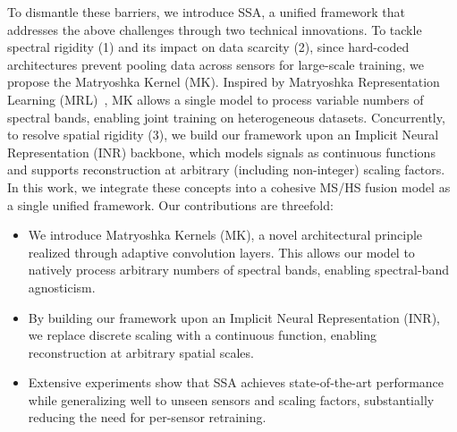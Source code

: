 To dismantle these barriers, we introduce SSA, a unified framework that addresses the above challenges through two technical innovations. To tackle spectral rigidity (1) and its impact on data scarcity (2), since hard-coded architectures prevent pooling data across sensors for large-scale training, we propose the Matryoshka Kernel (MK). Inspired by Matryoshka Representation Learning (MRL)~\cite{kusupati2022matryoshka}, MK allows a single model to process variable numbers of spectral bands, enabling joint training on heterogeneous datasets. Concurrently, to resolve spatial rigidity (3), we build our framework upon an Implicit Neural Representation (INR) backbone, which models signals as continuous functions and supports reconstruction at arbitrary (including non-integer) scaling factors.
In this work, we integrate these concepts into a cohesive MS/HS fusion model as a single unified framework. Our contributions are threefold:
\begin{itemize}
\item We introduce Matryoshka Kernels (MK), a novel architectural principle realized through adaptive convolution layers. This allows our model to natively process arbitrary numbers of spectral bands, enabling spectral-band agnosticism.
\item By building our framework upon an Implicit Neural Representation (INR), we replace discrete scaling with a continuous function, enabling reconstruction at arbitrary spatial scales.
\item Extensive experiments show that SSA achieves state-of-the-art performance while generalizing well to unseen sensors and scaling factors, substantially reducing the need for per-sensor retraining.
\end{itemize}
